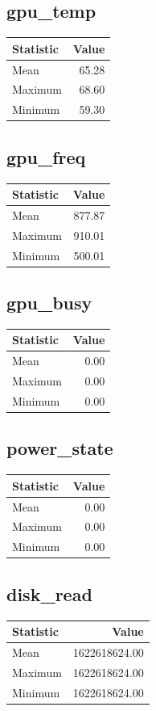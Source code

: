 \documentclass[11pt]{article}
\begin{document}
\subsection{gpu_temp}
\begin{tabular}{lr}
\toprule
Statistic & Value \\
\midrule
Mean & 65.28 \\
Maximum & 68.60 \\
Minimum & 59.30 \\
\bottomrule
\end{tabular}


\subsection{gpu_freq}
\begin{tabular}{lr}
\toprule
Statistic & Value \\
\midrule
Mean & 877.87 \\
Maximum & 910.01 \\
Minimum & 500.01 \\
\bottomrule
\end{tabular}


\subsection{gpu_busy}
\begin{tabular}{lr}
\toprule
Statistic & Value \\
\midrule
Mean & 0.00 \\
Maximum & 0.00 \\
Minimum & 0.00 \\
\bottomrule
\end{tabular}


\subsection{power_state}
\begin{tabular}{lr}
\toprule
Statistic & Value \\
\midrule
Mean & 0.00 \\
Maximum & 0.00 \\
Minimum & 0.00 \\
\bottomrule
\end{tabular}


\subsection{disk_read}
\begin{tabular}{lr}
\toprule
Statistic & Value \\
\midrule
Mean & 1622618624.00 \\
Maximum & 1622618624.00 \\
Minimum & 1622618624.00 \\
\bottomrule
\end{tabular}
\end{document}
